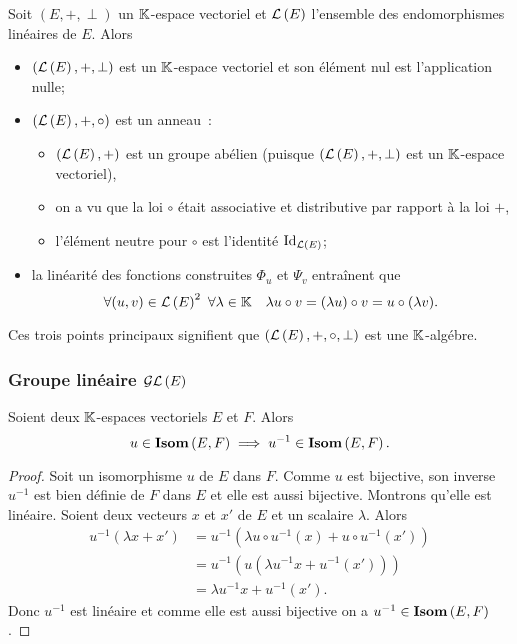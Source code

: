 Soit \((E,+,\perp)\) un \(\mathbb{K}\)-espace vectoriel et \(\mathcal{L}\left(E\right)\) l'ensemble des endomorphismes linéaires de \(E\). Alors
\begin{itemize}
\item \((\mathcal{L}\left(E\right),+,\perp)\) est un \(\mathbb{K}\)-espace vectoriel et son élément nul est l'application nulle;
\item \((\mathcal{L}\left(E\right), +, \circ)\) est un anneau~:
  \begin{itemize}
  \item \((\mathcal{L}\left(E\right),+)\) est un groupe abélien (puisque \((\mathcal{L}\left(E\right),+,\perp)\) est un \(\mathbb{K}\)-espace vectoriel),
  \item on a vu que la loi \(\circ\) était associative et distributive par rapport à la loi \(+\),
  \item l'élément neutre pour \(\circ\) est l'identité \(\operatorname{Id}_{\mathcal{L}\left(E\right)}\);
  \end{itemize}
\item la linéarité des fonctions construites \(\Phi_u\) et \(\Psi_v\) entraînent que
  \begin{equation}
    \forall (u,v) \in \mathcal{L}\left(E\right)^2 \ \forall \lambda \in \mathbb{K} \quad \lambda u \circ v = (\lambda u) \circ v = u \circ (\lambda v).
  \end{equation}
\end{itemize}

Ces trois points principaux signifient que \((\mathcal{L}\left(E\right),+,\circ, \perp)\) est une \(\mathbb{K}\)-algébre.

\subsubsection{Groupe linéaire \(\mathcal{GL}\left(E\right)\)}

\begin{theo}
  Soient deux \(\mathbb{K}\)-espaces vectoriels \(E\) et \(F\). Alors
  \begin{equation}
    u \in \mathbf{Isom}\left(E,F\right) \implies u^{-1} \in \mathbf{Isom}\left(E,F\right).
  \end{equation}
\end{theo}
\begin{proof}
  Soit un isomorphisme \(u\) de \(E\) dans \(F\). Comme \(u\) est bijective, son inverse \(u^{-1}\) est bien définie de \(F\) dans \(E\) et elle est aussi bijective. Montrons qu'elle est linéaire. Soient deux vecteurs \(x\) et \(x'\) de \(E\) et un scalaire \(\lambda\). Alors
  \begin{align}
    u^{-1}(\lambda x+x') &= u^{-1}(\lambda u\circ u^{-1} (x) + u \circ u^{-1}(x')) \\
    &=u^{-1}(u(\lambda u^{-1} x +u^{-1}(x'))) \\
    &=\lambda u^{-1} x +u^{-1}(x').
  \end{align}
  Donc \(u^{-1}\) est linéaire et comme elle est aussi bijective on a \(u^{-1} \in \mathbf{Isom}\left(E,F\right)\).
\end{proof}

